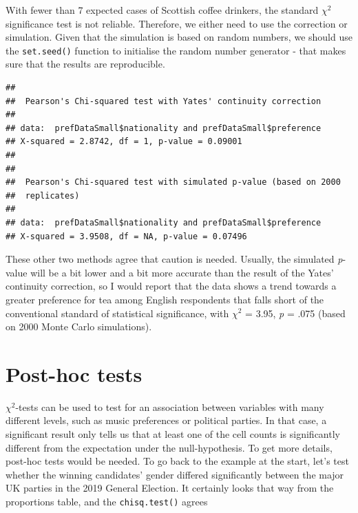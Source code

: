 \documentclass[
]{book}
\newenvironment{Shaded}{\begin{snugshade}}{\end{snugshade}}
\newcommand{\DataTypeTok}[1]{\textcolor[rgb]{0.13,0.29,0.53}{#1}}
\newcommand{\DecValTok}[1]{\textcolor[rgb]{0.00,0.00,0.81}{#1}}
\newcommand{\KeywordTok}[1]{\textcolor[rgb]{0.13,0.29,0.53}{\textbf{#1}}}
\newcommand{\NormalTok}[1]{#1}
\newcommand{\OperatorTok}[1]{\textcolor[rgb]{0.81,0.36,0.00}{\textbf{#1}}}
\newcommand{\OtherTok}[1]{\textcolor[rgb]{0.56,0.35,0.01}{#1}}
\begin{document}
With fewer than 7 expected cases of Scottish coffee drinkers, the standard \(\chi^2\) significance test is not reliable. Therefore, we either need to use the correction or simulation. Given that the simulation is based on random numbers, we should use the \texttt{set.seed()} function to initialise the random number generator - that makes sure that the results are reproducible.

\begin{Shaded}
\end{Shaded}

\begin{verbatim}
## 
## 	Pearson's Chi-squared test with Yates' continuity correction
## 
## data:  prefDataSmall$nationality and prefDataSmall$preference
## X-squared = 2.8742, df = 1, p-value = 0.09001
## 
## 
## 	Pearson's Chi-squared test with simulated p-value (based on 2000
## 	replicates)
## 
## data:  prefDataSmall$nationality and prefDataSmall$preference
## X-squared = 3.9508, df = NA, p-value = 0.07496
\end{verbatim}

These other two methods agree that caution is needed. Usually, the simulated \emph{p}-value will be a bit lower and a bit more accurate than the result of the Yates' continuity correction, so I would report that the data shows a trend towards a greater preference for tea among English respondents that falls short of the conventional standard of statistical significance, with \(\chi^2\) = 3.95, \emph{p} = .075 (based on 2000 Monte Carlo simulations).

\hypertarget{post-hoc-tests}{%
\section{Post-hoc tests}\label{post-hoc-tests}}

\(\chi^2\)-tests can be used to test for an association between variables with many different levels, such as music preferences or political parties. In that case, a significant result only tells us that at least one of the cell counts is significantly different from the expectation under the null-hypothesis. To get more details, post-hoc tests would be needed. To go back to the example at the start, let's test whether the winning candidates' gender differed significantly between the major UK parties in the 2019 General Election. It certainly looks that way from the proportions table, and the \texttt{chisq.test()} agrees
\end{document}
